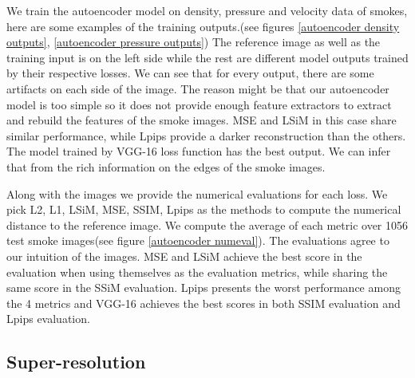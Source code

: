 \documentclass[a4paper,12pt,twoside]{report}
\begin{document}
We train the autoencoder model on density, pressure and velocity data of smokes, here are some examples of the training outputs.(see figures \ref{autoencoder density outputs}, \ref{autoencoder pressure outputs}) The reference image as well as the training input is on the left side  while the rest are different model outputs trained by their respective losses. We can see that for every output, there are some artifacts on each side of the image. The reason might be that our autoencoder model is too simple so it does not provide enough feature extractors to extract and rebuild the features of the smoke images. MSE and LSiM in this case share similar performance, while Lpips provide a darker reconstruction than the others. The model trained by VGG-16 loss function has the best output. We can infer that from the rich information on the edges of the smoke images.

 Along with the images we provide the numerical evaluations for each loss. We pick L2, L1, LSiM, MSE, SSIM, Lpips as the methods to compute the numerical distance to the reference image. We compute the average of each metric over 1056 test smoke images(see figure \ref{autoencoder numeval}). The evaluations agree to our intuition of the images. MSE and LSiM achieve the best score in the evaluation when using themselves as the evaluation metrics, while sharing the same score in the SSiM evaluation. Lpips presents the worst performance among the 4 metrics and VGG-16 achieves the best scores in both SSIM evaluation and Lpips evaluation.  
\subsection{Super-resolution}
\end{document}
